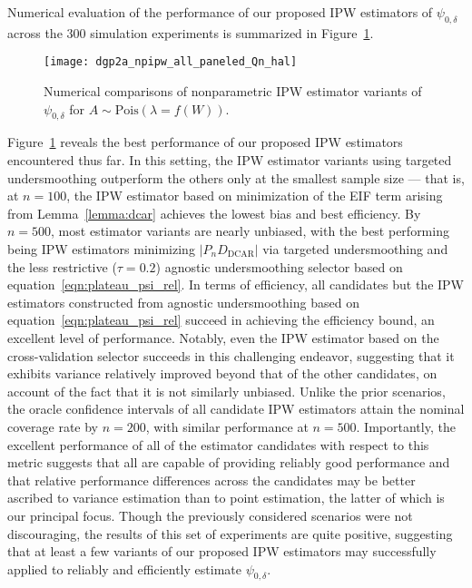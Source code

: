 Numerical evaluation of the performance of our proposed IPW estimators of
$\psi_{0,\delta}$ across the $300$ simulation experiments is summarized in
Figure~\ref{fig:dgp2a_npipw}.
\begin{figure}[H]
  \centering
  \texttt{[image: dgp2a\_npipw\_all\_paneled\_Qn\_hal]}
  \caption{Numerical comparisons of nonparametric IPW estimator variants of
       $\psi_{0,\delta}$ for $A \sim \text{Pois}(\lambda = f(W))$.}
  \label{fig:dgp2a_npipw}
\end{figure}
Figure~\ref{fig:dgp2a_npipw} reveals the best performance of our proposed IPW
estimators encountered thus far. In this setting, the IPW estimator variants
using targeted undersmoothing outperform the others only at the smallest sample
size --- that is, at $n=100$, the IPW estimator based on minimization of the
EIF term arising from Lemma~\ref{lemma:dcar} achieves the lowest bias and best
efficiency. By $n=500$, most estimator variants are nearly unbiased, with the
best performing being IPW estimators minimizing $\lvert P_n D_\text{DCAR}
\rvert$ via targeted undersmoothing and the less restrictive ($\tau = 0.2$)
agnostic undersmoothing selector based on equation~\ref{eqn:plateau_psi_rel}. In
terms of efficiency, all candidates but the IPW estimators constructed from
agnostic undersmoothing based on equation~\ref{eqn:plateau_psi_rel} succeed in
achieving the efficiency bound, an excellent level of performance. Notably, even
the IPW estimator based on the cross-validation selector succeeds in this
challenging endeavor, suggesting that it exhibits variance relatively improved
beyond that of the other candidates, on account of the fact that it is not
similarly unbiased. Unlike the prior scenarios, the oracle confidence intervals
of all candidate IPW estimators attain the nominal coverage rate by $n=200$,
with similar performance at $n=500$. Importantly, the excellent performance of
all of the estimator candidates with respect to this metric suggests that all
are capable of providing reliably good performance and that relative performance
differences across the candidates may be better ascribed to variance estimation
than to point estimation, the latter of which is our principal focus. Though the
previously considered scenarios were not discouraging, the results of this set
of experiments are quite positive, suggesting that at least a few variants of
our proposed IPW estimators may successfully applied to reliably and efficiently
estimate $\psi_{0,\delta}$.

